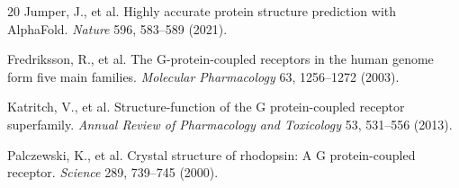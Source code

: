 \documentclass[11pt,a4paper]{article}
\begin{document}
\begin{thebibliography}{20}
Jumper, J., et al.
Highly accurate protein structure prediction with AlphaFold.
\textit{Nature} 596, 583--589 (2021).

Fredriksson, R., et al.
The G-protein-coupled receptors in the human genome form five main families.
\textit{Molecular Pharmacology} 63, 1256--1272 (2003).

Katritch, V., et al.
Structure-function of the G protein-coupled receptor superfamily.
\textit{Annual Review of Pharmacology and Toxicology} 53, 531--556 (2013).

Palczewski, K., et al.
Crystal structure of rhodopsin: A G protein-coupled receptor.
\textit{Science} 289, 739--745 (2000).

\end{thebibliography}
\end{document}
